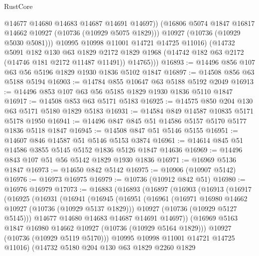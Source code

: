 \begin{lexlean}{RustCore}
\begin{coremodule}
                @14677
                @14680
                @14683
                @14687
                @14691
                @14697))
            (@16806 @5074 @1847 @16817 @14662 @10927 (@10736 (@10929 @5075 @1829)))
            @10927
            (@10736 (@10929 @5030 @5081)))
          @10995
          @10998
          @11001
          @14721
          @14725
          @11016)
        (@14732
          @5091
          @182
          @130
          @63
          @1829
          @2172
          @1829
          @1968
          (@14742 @182 @63 @2172 (@14746 @181 @2172 @11487 @11491))
          @14765)))
@16893 := @14496 @856 @107 @63 @56 @5196 @1829 @1930 @1836 @5102 @1847
@16897 := @14508 @856 @63 @5188 @5194
@16903 := @14784 @855 @10647 @63 @5188 @5192 @2049
@16913 := @14496 @853 @107 @63 @56 @5185 @1829 @1930 @1836 @5110 @1847
@16917 := @14508 @853 @63 @5171 @5183
@16925 := @14575 @850 @204 @130 @63 @5171 @5180 @1829 @5183
@16931 := @14584 @849 @14587 @10835 @5171 @5178 @1950
@16941 := @14496 @847 @845 @51 @14586 @5157 @5170 @5177 @1836 @5118 @1847
@16945 := @14508 @847 @51 @5146 @5155
@16951 := @14607 @846 @14587 @51 @5146 @5153 @3874
@16961 := @14614 @845 @51 @14586 @3855 @5145 @5152 @1836 @5126 @1847 @14636
@16969 := @14496 @843 @107 @51 @56 @5142 @1829 @1930 @1836
@16971 := @16969 @5136 @1847
@16973 := @14650 @842 @5142
@16975 := @10906 (@10907 @5142)
@16976 := @16973 @16975
@16979 := @10736 (@10912 @842 @51)
@16980 := @16976 @16979
@17073 := @16883
    (@16893
      (@16897
        (@16903
          (@16913
            (@16917
              (@16925
                (@16931
                  (@16941
                    (@16945
                      (@16951
                        (@16961
                          (@16971 @16980 @14662 @10927 (@10736 (@10929 @5137 @1829)))
                          @10927
                          (@10736 (@10929 @5127 @5145)))
                        @14677
                        @14680
                        @14683
                        @14687
                        @14691
                        @14697))
                    (@16969 @5163 @1847 @16980 @14662 @10927 (@10736 (@10929 @5164 @1829)))
                    @10927
                    (@10736 (@10929 @5119 @5170)))
                  @10995
                  @10998
                  @11001
                  @14721
                  @14725
                  @11016)
                (@14732
                  @5180
                  @204
                  @130
                  @63
                  @1829
                  @2260
                  @1829

\end{coremodule}
\end{lexlean}
